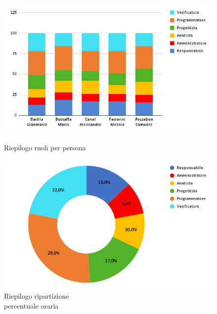 \begin{figure}[h!]
	\centering
	\begin{minipage}[c]{0.42\textwidth}
    	\includegraphics[scale=0.42]{../../assets/Diagrammi_Excel/RiepilogoPB-Ruoli.png}
		\caption{Riepilogo ruoli per persona}
	\end{minipage}
\hfill
	\begin{minipage}[c]{0.46\textwidth}
		\includegraphics[scale=0.38]{../../assets/Diagrammi_Excel/RiepilogoPB-torta.png}
		\caption{Riepilogo ripartizione\\ percentuale oraria}
	\end{minipage}
\end{figure}

\setlength\extrarowheight{0pt}



